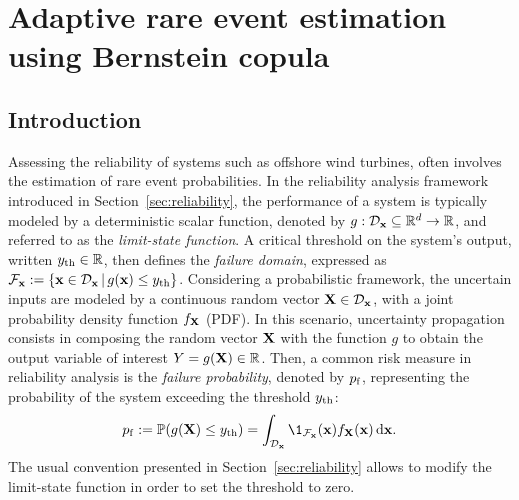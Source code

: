 \cleardoublepage
\chapter{Adaptive rare event estimation using Bernstein copula}
\label{chpt:6}
\hfill
\localtableofcontents
\newpage

\section{Introduction}

Assessing the reliability of systems such as offshore wind turbines, often involves the estimation of rare event probabilities. 
In the reliability analysis framework introduced in Section~\ref{sec:reliability}, the performance of a system is typically modeled by a deterministic scalar function, denoted by $g: \mathcal{D}_{\bf x} \subseteq \mathbb{R}^d \rightarrow \mathbb{R}$, and referred to as the \textit{limit-state function}. 
A critical threshold on the system's output, written $y_\mathrm{th} \in \mathbb{R}$, then defines the \textit{failure domain}, expressed as $\mathcal{F}_{{\bf x}} := \{{\bf x} \in \mathcal{D}_{\bf x} \, | \,  g({\bf x}) \leq y_\mathrm{th}\}$. 
Considering a probabilistic framework, the uncertain inputs are modeled by a continuous random vector ${\bf X} \in \mathcal{D}_{\bf x}$, with a joint probability density function $f_{\bf X}$ (PDF). 
In this scenario, uncertainty propagation consists in composing the random vector ${\bf X}$ with the function $g$ to obtain the output variable of interest $Y = g({\bf X}) \in \mathbb{R}$. 
Then, a common risk measure in reliability analysis is the \textit{failure probability}, denoted by $p_\mathrm{f}$, representing the probability of the system exceeding the threshold $y_\mathrm{th}$:
\begin{equation}
    \label{eq:failure_proba_c6}
    \pf := \P(g(\bX) \leq \yth)
        = \int_{\iD_\bx} \1_{\iF_\bx}(\bx) f_\bX(\bx) \, \dd\bx.
\end{equation}
The usual convention presented in Section~\ref{sec:reliability} allows to modify the limit-state function in order to set the threshold to zero. 

